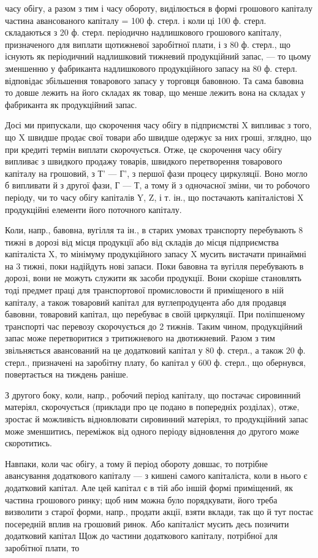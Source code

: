 \parcont{}  %
часу обігу, а разом з тим і часу обороту, виділюється в формі грошового
капіталу  частина авансованого капіталу = 100 ф. стерл. і коли
ці 100 ф. стерл. складаються з 20 ф. стерл. періодично надлишкового
грошового капіталу, призначеного для виплати щотижневої заробітної
плати, і з 80 ф. стерл., що існують як періодичний надлишковий тижневий
продукційний запас, — то цьому зменшенню у фабриканта надлишкового
продукційного запасу на 80 ф. стерл. відповідає збільшення товарового
запасу у торговця бавовною. Та сама бавовна то довше лежить
на його складах як товар, що менше лежить вона на складах у фабриканта
як продукційний запас.

Досі ми припускали, що скорочення часу обігу в підприємстві X випливає
з того, що X швидше продає свої товари або швидше одержує
за них гроші, зглядно, що при кредиті термін виплати скорочується.
Отже, це скорочення часу обігу випливає з швидкого продажу товарів,
швидкого перетворення товарового капіталу на грошовий, з Т' — Г', з
першої фази процесу циркуляції. Воно могло б випливати й з другої фази,
Г — Т, а тому й з одночасної зміни, чи то робочого періоду, чи то часу
обігу капіталів Y, Z, і т. ін., що постачають капіталістові X продукційні
елементи його поточного капіталу.

Коли, напр., бавовна, вугілля та ін., в старих умовах транспорту перебувають
8 тижні в дорозі від місця продукції або від складів до місця
підприємства капіталіста X, то мінімуму продукційного запасу X мусить
вистачати принаймні на 3 тижні, поки надійдуть нові запаси. Поки
бавовна та вугілля перебувають в дорозі, вони не можуть служити як
засоби продукції. Вони скоріше становлять тоді предмет праці для транспортової
промисловости й приміщеного в ній капіталу, а також товаровий
капітал для вуглепродуцента або для продавця бавовни, товаровий капітал,
що перебуває в своїй циркуляції. При поліпшеному транспорті час
перевозу скорочується до 2 тижнів. Таким чином, продукційний запас може
перетворитися з тритижневого на двотижневий. Разом з тим звільняється
авансований на це додатковий капітал у 80 ф. стерл., а також 20
ф. стерл., призначені на заробітну плату, бо капітал у 600 ф. стерл.,
що обернувся, повертається на тиждень раніше.

З другого боку, коли, напр., робочий період капіталу, що постачає
сировинний матеріял, скорочується (приклади про це подано в попередніх
розділах), отже, зростає й можливість відновлювати сировинний матеріял,
то продукційний запас може зменшитись, переміжок від одного періоду
відновлення до другого може скоротитись.

Навпаки, коли час обігу, а тому й період обороту довшає, то потрібне
авансування додаткового капіталу — з кишені самого капіталіста,
коли в нього є додатковий капітал. Але цей капітал є в тій
або іншій формі приміщений, як частина грошового ринку; щоб ним
можна було порядкувати, його треба визволити з старої форми, напр.,
продати акції, взяти вклади, так що й тут постає посередній вплив на
грошовий ринок. Або капіталіст мусить десь позичити додатковий капітал
Щож до частини додаткового капіталу, потрібної для заробітної плати, то
\parbreak{}  %

